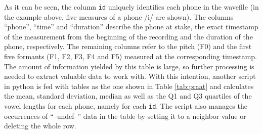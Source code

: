 \documentclass[a4paper,11pt]{article}
\begin{document}
As it can be seen, the column \texttt{id} uniquely identifies each phone in the wavefile (in the example above, five measures of a phone /i/ are shown). The columns ``phone'', ``time'' and ``duration'' describe the phone at stake, the exact timestamp of the measurement from the beginning of the recording and the duration of the phone, respectively. The remaining columns refer to the pitch (F0) and the first five formants (F1, F2, F3, F4 and F5) measured at the corresponding timestamp. The amount of information yielded by this table is large, so further processing is needed to extract valuable data to work with. With this intention, another script in python is fed with tables as the one shown in Table \ref{tab:praat} and calculates the mean, standard deviation, median as well as the Q1 and Q3 quartiles of the vowel lengths for each phone, namely for each \texttt{id}. The script also manages the occurrences of ``--undef--'' data in the table by setting it to a neighbor value or deleting the whole row.%
 
\end{document}
